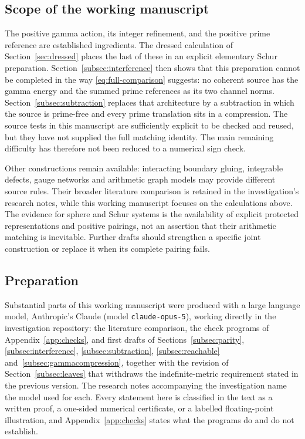 \subsection{Scope of the working manuscript}
The positive gamma action, its integer refinement, and the positive
prime reference are established ingredients. The dressed calculation of
Section~\ref{sec:dressed} places the last of these in an explicit elementary
Schur preparation. Section~\ref{subsec:interference} then shows that this
preparation cannot be completed in the way \eqref{eq:full-comparison}
suggests: no coherent source has the gamma energy and the summed prime
references as its two channel norms. Section~\ref{subsec:subtraction}
replaces that architecture by a subtraction in which the source is prime-free
and every prime translation sits in a compression. The source tests in this manuscript are
sufficiently explicit to be checked and reused, but they have not supplied
the full matching identity. The main remaining difficulty has therefore not
been reduced to a numerical sign check.

Other constructions remain available: interacting boundary gluing,
integrable defects, gauge networks and arithmetic graph models may
provide different source rules. Their broader literature comparison
is retained in the investigation's research notes, while this working
manuscript focuses on the calculations above. The evidence for sphere
and Schur systems is the availability of explicit protected
representations and positive pairings, not an assertion that their
arithmetic matching is inevitable. Further drafts should strengthen a
specific joint construction or replace it when its complete pairing fails.

\subsection*{Preparation}
Substantial parts of this working manuscript were produced with a large
language model, Anthropic's Claude (model \texttt{claude-opus-5}), working
directly in the investigation repository: the literature comparison, the
check programs of Appendix~\ref{app:checks}, and first drafts of
Sections~\ref{subsec:parity}, \ref{subsec:interference},
\ref{subsec:subtraction}, \ref{subsec:reachable}
and~\ref{subsec:gammacompression}, together with the revision of
Section~\ref{subsec:leaves} that withdraws the indefinite-metric requirement
stated in the previous version. The research notes accompanying the
investigation name the model used for each. Every statement here is
classified in the text as a written proof, a one-sided numerical certificate,
or a labelled floating-point illustration, and Appendix~\ref{app:checks}
states what the programs do and do not establish.
